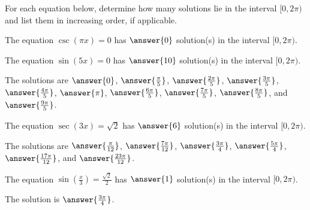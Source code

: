 \documentclass{ximera}
\author{Kenneth Berglund}
\begin{document}
\licenseSZ
For each equation below, determine how many solutions lie in the interval $[0, 2\pi)$ and list them in increasing order, if applicable.

\begin{exercise}
The equation $\csc(\pi x) = 0$ has $\answer{0}$ solution(s) in the interval $[0, 2\pi)$. 

\end{exercise}

\begin{exercise}
The equation $\sin(5x) = 0$ has $\answer{10}$ solution(s) in the interval $[0, 2\pi)$.

\begin{exercise}
The solutions are $\answer{0}$,  $\answer{\frac{\pi}{5}}$, $\answer{\frac{2\pi}{5}}$, $\answer{\frac{3\pi}{5}}$, $\answer{\frac{4\pi}{5}}$, $\answer{\pi}$,  $\answer{\frac{6\pi}{5}}$, $\answer{\frac{7\pi}{5}}$, $\answer{\frac{8\pi}{5}}$, and $\answer{\frac{9\pi}{5}}$.
\end{exercise}
\end{exercise} 

\begin{exercise}
The equation $\sec(3x) = \sqrt{2}$ has $\answer{6}$ solution(s) in the interval $[0, 2\pi)$.

\begin{exercise}
The solutions are $\answer{\frac{\pi}{12}}$, $\answer{\frac{7\pi}{12}}$, $\answer{\frac{3\pi}{4}}$, $\answer{\frac{5\pi}{4}}$, $\answer{\frac{17\pi}{12}}$, and $\answer{\frac{23\pi}{12}}$.
\end{exercise}
\end{exercise} 

\begin{exercise}
The equation $\sin\left(\frac{x}{3}\right) = \frac{\sqrt{2}}{2}$ has $\answer{1}$ solution(s) in the interval $[0, 2\pi)$.

\begin{exercise}
The solution is $\answer{\frac{3\pi}{4}}$.
\end{exercise}
\end{exercise} 
\end{document}

